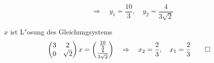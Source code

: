 \begin{loesung}
\begin{teilaufgaben}
\[\quad
\Rightarrow
\quad
y_1=\frac{10}{3},\quad y_2=\frac{4}{3\sqrt{2}}
\]
\item $x$ ist L"osung des Gleichungsystems
\[
\begin{pmatrix}
3&2\\
0&\sqrt{2}
\end{pmatrix}x=\begin{pmatrix}
\frac{10}{3}\\
\frac{4}{3\sqrt{2}}
\end{pmatrix}
\quad\Rightarrow\quad
x_2=\frac23,\quad x_1=\frac23
\qedhere
\]
\end{teilaufgaben}
\end{loesung}

